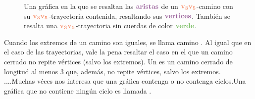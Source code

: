     \begin{figure}[htb!]
        \centering
        \caption{Una gr\'afica en la que se resaltan las ${\color{morado}\bf
        aristas}$ de un ${\color{coral}\bf v_3 v_5}$-camino con su
        ${\color{coral}\bf v_3 v_5}$-trayectoria contenida, resaltando sus
        ${\color{morado}\bf vertices}$.  Tambi\'en se resalta una
        ${\color{coral}\bf v_3 v_5}$-trayectoria sin cuerdas de color
        ${\color{verde}\bf verde}$.}
        \label{fig:ex-caminos}
    \end{figure}
   

    Cuando los extremos de un camino son iguales, se llama camino
    . Al igual que en el caso de las trayectorias,
    vale la pena resaltar el caso en el que un camino cerrado no repite
    v\'ertices (salvo los extremos). Un  es un camino cerrado de
    longitud al menos $3$ que, adem\'as, no repite v\'ertices, salvo los
    extremos. ....Muchas v\'eces nos interesa que una gr\'afica contenga o no
    contenga ciclos.Una gr\'afica que no contiene ning\'un ciclo es llamada
    .
   
